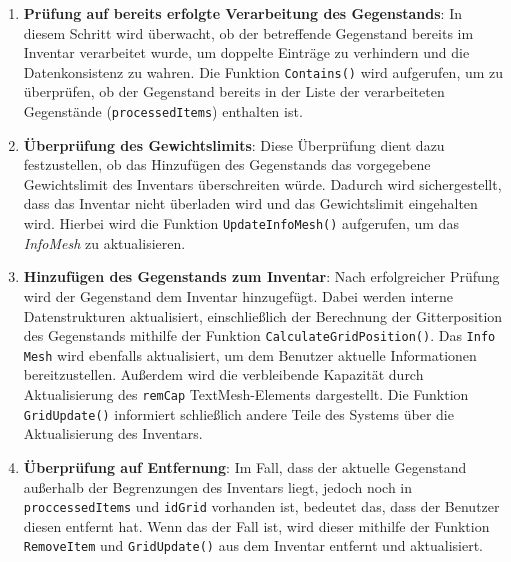 \begin{itemize}
\begin{enumerate}
    \item \textbf{Prüfung auf bereits erfolgte Verarbeitung des Gegenstands}:
    In diesem Schritt wird überwacht, ob der betreffende Gegenstand bereits im Inventar verarbeitet wurde, um doppelte
    Einträge zu verhindern und die Datenkonsistenz zu wahren. Die Funktion \texttt{Contains()} wird aufgerufen, um zu
    überprüfen, ob der Gegenstand bereits in der Liste der verarbeiteten Gegenstände (\texttt{processedItems}) enthalten
    ist.

    \item \textbf{Überprüfung des Gewichtslimits}:
    Diese Überprüfung dient dazu festzustellen, ob das Hinzufügen des Gegenstands das vorgegebene Gewichtslimit des
    Inventars überschreiten würde. Dadurch wird sichergestellt, dass das Inventar nicht überladen wird und das
    Gewichtslimit eingehalten wird. Hierbei wird die Funktion \texttt{UpdateInfoMesh()} aufgerufen, um das \textit{InfoMesh}
    zu aktualisieren.

    \item \textbf{Hinzufügen des Gegenstands zum Inventar}:
    Nach erfolgreicher Prüfung wird der Gegenstand dem Inventar hinzugefügt. Dabei werden interne Datenstrukturen
    aktualisiert, einschließlich der Berechnung der Gitterposition des Gegenstands mithilfe der Funktion
    \texttt{CalculateGridPosition()}. Das \texttt{Info Mesh} wird ebenfalls aktualisiert, um dem Benutzer aktuelle
    Informationen bereitzustellen. Außerdem wird die verbleibende Kapazität durch Aktualisierung des \texttt{remCap}
    TextMesh-Elements dargestellt. Die Funktion \texttt{GridUpdate()} informiert schließlich andere Teile des Systems
    über die Aktualisierung des Inventars.

    \item \textbf{Überprüfung auf Entfernung}:
    Im Fall, dass der aktuelle Gegenstand außerhalb der Begrenzungen des Inventars liegt, jedoch noch in
    \texttt{proccessedItems} und \texttt{idGrid} vorhanden ist, bedeutet das, dass der Benutzer diesen entfernt
    hat. Wenn das der Fall ist, wird dieser mithilfe der Funktion \texttt{RemoveItem} und \texttt{GridUpdate()} aus
    dem Inventar entfernt und aktualisiert.
\end{enumerate}


\end{itemize}
